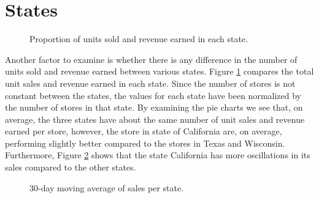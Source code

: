 \section{States}
\begin{figure}
    \vspace{-10pt}
    \centering
    \captionsetup{width=0.52\textwidth}
    \caption{Proportion of units sold and revenue earned in each state.}
    \label{fig:sales_rev_states}
    \vspace{-20pt}
\end{figure}

Another factor to examine is whether there is any difference in the number of units sold and revenue earned between various states.
Figure \ref{fig:sales_rev_states} compares the total unit sales and revenue earned in each state. 
Since the number of stores is not constant between the states, the values for each state have been normalized by the number of stores in that state.
By examining the pie charts we see that, on average, the three states have about the same number of unit sales and revenue earned per store, however, the store in state of California are, on average, performing slightly better compared to the stores in Texas and Wisconsin. 
Furthermore, Figure \ref{fig:state_sales} shows that the state California has more oscillations in its sales compared to the other states.
\begin{figure}[H]
    \centering
    \captionsetup{width=0.98\textwidth}
    \caption{30-day moving average of sales per state.}
    \label{fig:state_sales}
\end{figure} 


